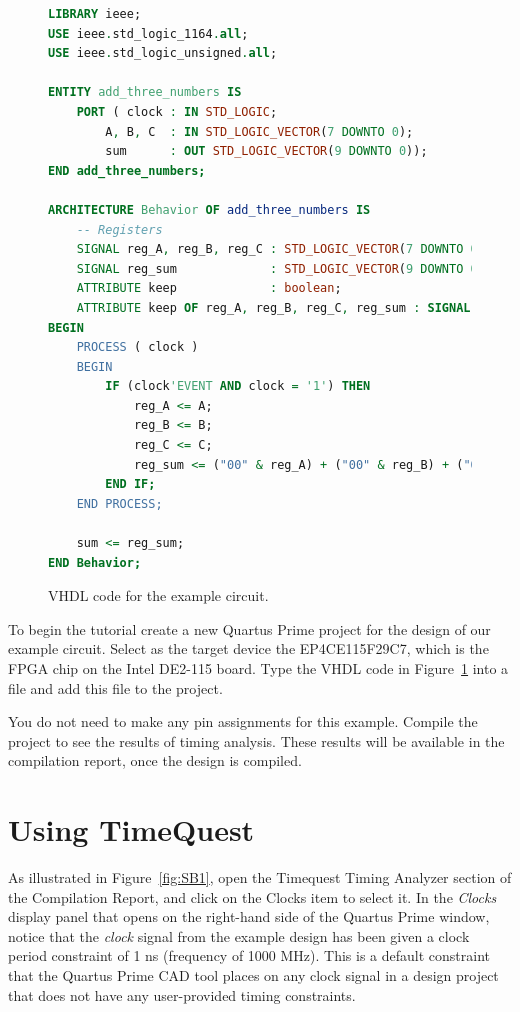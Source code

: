 \documentclass[11pt, twoside, pdftex]{article}
\begin{document}
\begin{figure}[H]
\begin{lstlisting}[language=VHDL]
LIBRARY ieee;
USE ieee.std_logic_1164.all;
USE ieee.std_logic_unsigned.all;

ENTITY add_three_numbers IS
    PORT ( clock : IN STD_LOGIC;
        A, B, C  : IN STD_LOGIC_VECTOR(7 DOWNTO 0);
        sum      : OUT STD_LOGIC_VECTOR(9 DOWNTO 0));
END add_three_numbers;

ARCHITECTURE Behavior OF add_three_numbers IS
    -- Registers
    SIGNAL reg_A, reg_B, reg_C : STD_LOGIC_VECTOR(7 DOWNTO 0);
    SIGNAL reg_sum             : STD_LOGIC_VECTOR(9 DOWNTO 0);
    ATTRIBUTE keep             : boolean;
    ATTRIBUTE keep OF reg_A, reg_B, reg_C, reg_sum : SIGNAL IS true;
BEGIN
    PROCESS ( clock )
    BEGIN
        IF (clock'EVENT AND clock = '1') THEN
            reg_A <= A;
            reg_B <= B;
            reg_C <= C;
            reg_sum <= ("00" & reg_A) + ("00" & reg_B) + ("00" & reg_C);
        END IF;
    END PROCESS;

    sum <= reg_sum;
END Behavior;
\end{lstlisting}
\caption{VHDL code for the example circuit.}
\label{fig:design_VHDL_code}
\end{figure}

To begin the tutorial create a new Quartus Prime project for the design of our example circuit. 
Select as the target device the EP4CE115F29C7, which is the FPGA chip on the Intel DE2-115 
board. Type the VHDL code in Figure~\ref{fig:design_VHDL_code} into a file and add
this file to the project. 

You do not need to make any pin assignments for this example.  Compile the project to see the 
results of timing analysis. These results will be available in the compilation
report, once the design is compiled. 

\section{Using TimeQuest}

As illustrated in Figure~\ref{fig:SB1}, open the Timequest Timing Analyzer section 
of the Compilation Report, and click on the {\sf Clocks} item to select it. 
In the {\it Clocks} display panel that opens on the right-hand side of the Quartus Prime
window, notice that the {\it clock} signal from the example design 
has been given a clock period constraint of 1 ns (frequency of 1000 MHz). This is a
default constraint that the Quartus Prime CAD tool places on any clock signal in a design project
that does not have any user-provided timing constraints. 
\end{document}
